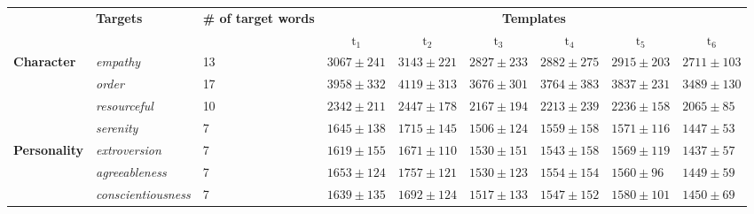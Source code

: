 \begingroup
\setlength{\tabcolsep}{3.5pt} 
\renewcommand{\arraystretch}{1} %
\begin{table*}[htbp]
    \setlength{\belowdisplayskip}{-10pt} 
    \vspace{-3mm}
\footnotesize
  \centering
    \begin{tabular}{@{}p{1.5cm}p{2.6cm}p{0.9cm}p{1.4cm}p{1.4cm}p{1.4cm}p{1.4cm}p{1.4cm}p{1.4cm}}
    \toprule
    \multirow{2}[4]{*}{\textbf{}} 
            & \multicolumn{1}{l}{\multirow{2}[4]{*}{\textbf{Targets}}} & \textbf{\# of target words} & \multicolumn{6}{c}{\textbf{Templates}} \\
    
    \cmidrule{3-9}          &       &  & \multicolumn{1}{c}{\textbf{$\text{t}_1$}} & \multicolumn{1}{c}{\textbf{$\text{t}_2$}} & \multicolumn{1}{c}{\textbf{$\text{t}_3$}} & \multicolumn{1}{c}{\textbf{$\text{t}_4$}} & \multicolumn{1}{c}{\textbf{$\text{t}_5$}} & \multicolumn{1}{c}{\textbf{$\text{t}_6$}} \\
    \midrule
    \multirow{4}[8]{*}{\textbf{Character}} 
            & \textit{empathy} & 13 & $3067\pm241$  & $3143\pm221$  & $2827\pm233$  & $2882\pm275$  & $2915\pm203$  & $2711\pm103$ \\
            
            \cmidrule{2-9} & \textit{order} & 17 & $3958\pm332$  & $4119\pm313$  & $3676\pm301$  & $3764\pm383$  & $3837\pm231$  & $3489\pm130$ \\

            \cmidrule{2-9} & \textit{resourceful} & 10 & $2342\pm211$  & $2447\pm178$  & $2167\pm194$  & $2213\pm239$  & $2236\pm158$  & $2065\pm85$ \\
            
            \cmidrule{2-9}  & \textit{serenity} & 7 &  $1645\pm138$  & $1715\pm145$  & $1506\pm124$  & $1559\pm158$  & $1571\pm116$  & $1447\pm53$ \\
    \midrule
    \multirow{5}[10]{*}{\textbf{Personality}} 
            & \textit{extroversion} & 7 & $1619\pm155$  & $1671\pm110$  & $1530\pm151$  & $1543\pm158$  & $1569\pm119$  & $1437\pm57$ \\
            
            \cmidrule{2-9}          & \textit{agreeableness} & 7 &  $1653\pm124$  & $1757\pm121$  & $1530\pm123$  & $1554\pm154$  & $1560\pm96$  & $1449\pm59$ \\

            \cmidrule{2-9}          & \textit{conscientiousness} & 7 &  $1639\pm135$  & $1692\pm124$  & $1517\pm133$  & $1547\pm152$  & $1580\pm101$  & $1450\pm69$ \\
            

\end{tabular}
\end{table*}
